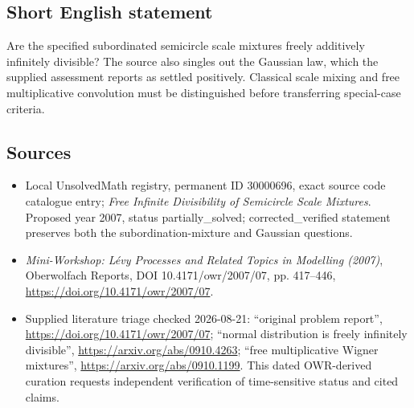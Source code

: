 \documentclass[11pt]{article}
\begin{document}
\subsection{Short English statement}
Are the specified subordinated semicircle scale mixtures freely additively infinitely divisible? The source also singles out the Gaussian law, which the supplied assessment reports as settled positively. Classical scale mixing and free multiplicative convolution must be distinguished before transferring special-case criteria.
\subsection{Sources}
\begin{itemize}
\item Local UnsolvedMath registry, permanent ID 30000696, exact source code catalogue entry; \emph{Free Infinite Divisibility of Semicircle Scale Mixtures}. Proposed year 2007, status partially\_solved; corrected\_verified statement preserves both the subordination-mixture and Gaussian questions.
\item \emph{Mini-Workshop: L\'evy Processes and Related Topics in Modelling (2007)}, Oberwolfach Reports, DOI 10.4171/owr/2007/07, pp. 417--446, \url{https://doi.org/10.4171/owr/2007/07}.
\item Supplied literature triage checked 2026-08-21: ``original problem report'', \url{https://doi.org/10.4171/owr/2007/07}; ``normal distribution is freely infinitely divisible'', \url{https://arxiv.org/abs/0910.4263}; ``free multiplicative Wigner mixtures'', \url{https://arxiv.org/abs/0910.1199}. This dated OWR-derived curation requests independent verification of time-sensitive status and cited claims.
\end{itemize}
\end{document}
